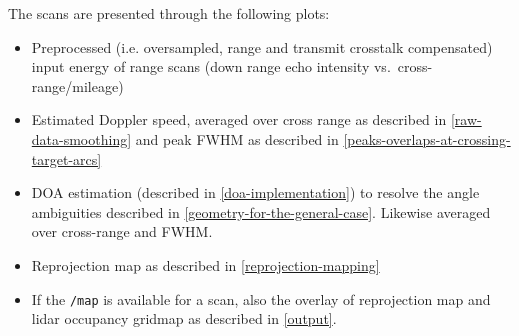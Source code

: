 The scans are presented through the following plots:
\begin{itemize}
    \item Preprocessed (i.e. oversampled, range and transmit crosstalk compensated) input energy of range scans (down range echo intensity vs.~cross-range/mileage)
    \item Estimated Doppler speed, averaged over cross range as described in \cref{raw-data-smoothing} and peak FWHM as described in \cref{peaks-overlaps-at-crossing-target-arcs}
    \item DOA estimation (described in \cref{doa-implementation}) to resolve the angle ambiguities described in \cref{geometry-for-the-general-case}. Likewise averaged over cross-range and FWHM.
    \item Reprojection map as described in \cref{reprojection-mapping}
    \item If the \texttt{/map} is available for a scan, also the overlay of reprojection map and lidar occupancy gridmap as described in \cref{output}.
\end{itemize}

